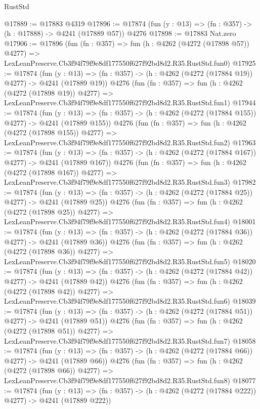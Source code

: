 \begin{lexlean}{RustStd}
\begin{coremodule}
@17889 := @17883 @4319
@17896 := @17874 (fun (y : @13) => (fn : @357) -> (h : @17888) -> @4241 (@17889 @57)) @4276
@17898 := @17883 Nat.zero
@17906 := @17896
    (fun (fn : @357) =>
    fun (h : @4262 (@4272 (@17898 @57)) @4277) =>
    LexLeanPreserve.Cb3f94f79f9e8df177550f627f92bd8d2.R35.RustStd.fun0)
@17925 := @17874
    (fun (y : @13) => (fn : @357) -> (h : @4262 (@4272 (@17884 @19)) @4277) -> @4241 (@17889 @19))
    @4276
    (fun (fn : @357) =>
    fun (h : @4262 (@4272 (@17898 @19)) @4277) =>
    LexLeanPreserve.Cb3f94f79f9e8df177550f627f92bd8d2.R35.RustStd.fun1)
@17944 := @17874
    (fun (y : @13) => (fn : @357) -> (h : @4262 (@4272 (@17884 @155)) @4277) -> @4241 (@17889 @155))
    @4276
    (fun (fn : @357) =>
    fun (h : @4262 (@4272 (@17898 @155)) @4277) =>
    LexLeanPreserve.Cb3f94f79f9e8df177550f627f92bd8d2.R35.RustStd.fun2)
@17963 := @17874
    (fun (y : @13) => (fn : @357) -> (h : @4262 (@4272 (@17884 @167)) @4277) -> @4241 (@17889 @167))
    @4276
    (fun (fn : @357) =>
    fun (h : @4262 (@4272 (@17898 @167)) @4277) =>
    LexLeanPreserve.Cb3f94f79f9e8df177550f627f92bd8d2.R35.RustStd.fun3)
@17982 := @17874
    (fun (y : @13) => (fn : @357) -> (h : @4262 (@4272 (@17884 @25)) @4277) -> @4241 (@17889 @25))
    @4276
    (fun (fn : @357) =>
    fun (h : @4262 (@4272 (@17898 @25)) @4277) =>
    LexLeanPreserve.Cb3f94f79f9e8df177550f627f92bd8d2.R35.RustStd.fun4)
@18001 := @17874
    (fun (y : @13) => (fn : @357) -> (h : @4262 (@4272 (@17884 @36)) @4277) -> @4241 (@17889 @36))
    @4276
    (fun (fn : @357) =>
    fun (h : @4262 (@4272 (@17898 @36)) @4277) =>
    LexLeanPreserve.Cb3f94f79f9e8df177550f627f92bd8d2.R35.RustStd.fun5)
@18020 := @17874
    (fun (y : @13) => (fn : @357) -> (h : @4262 (@4272 (@17884 @42)) @4277) -> @4241 (@17889 @42))
    @4276
    (fun (fn : @357) =>
    fun (h : @4262 (@4272 (@17898 @42)) @4277) =>
    LexLeanPreserve.Cb3f94f79f9e8df177550f627f92bd8d2.R35.RustStd.fun6)
@18039 := @17874
    (fun (y : @13) => (fn : @357) -> (h : @4262 (@4272 (@17884 @51)) @4277) -> @4241 (@17889 @51))
    @4276
    (fun (fn : @357) =>
    fun (h : @4262 (@4272 (@17898 @51)) @4277) =>
    LexLeanPreserve.Cb3f94f79f9e8df177550f627f92bd8d2.R35.RustStd.fun7)
@18058 := @17874
    (fun (y : @13) => (fn : @357) -> (h : @4262 (@4272 (@17884 @66)) @4277) -> @4241 (@17889 @66))
    @4276
    (fun (fn : @357) =>
    fun (h : @4262 (@4272 (@17898 @66)) @4277) =>
    LexLeanPreserve.Cb3f94f79f9e8df177550f627f92bd8d2.R35.RustStd.fun8)
@18077 := @17874
    (fun (y : @13) => (fn : @357) -> (h : @4262 (@4272 (@17884 @222)) @4277) -> @4241 (@17889 @222))

\end{coremodule}
\end{lexlean}
